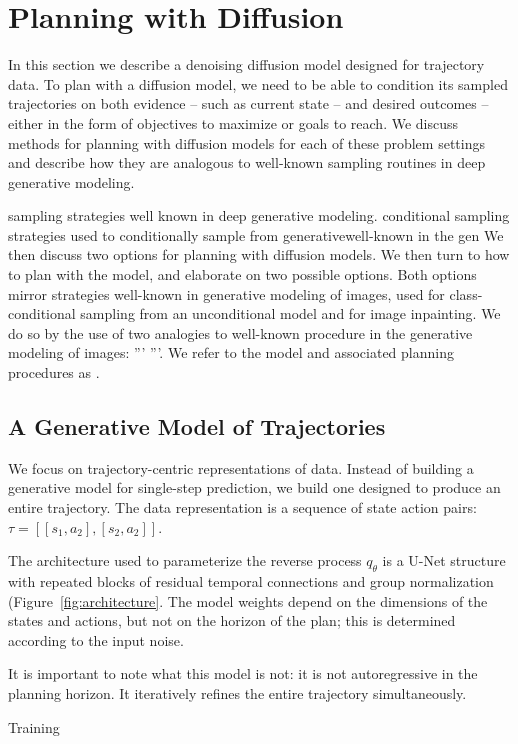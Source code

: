 \section{Planning with Diffusion}

In this section we describe a denoising diffusion model designed for trajectory data.
To plan with a diffusion model, we need to be able to condition its sampled trajectories on both evidence -- such as current state -- and desired outcomes -- either in the form of objectives to maximize or goals to reach.
We discuss methods for planning with diffusion models for each of these problem settings and describe how they are analogous to well-known sampling routines in deep generative modeling.

sampling strategies well known in deep generative modeling.
conditional sampling strategies used to conditionally sample from generativewell-known in the gen
We then discuss two options for planning with diffusion models.
We then turn to how to plan with the model, and elaborate on two possible options.
Both options mirror strategies well-known in generative modeling of images,
used for class-conditional sampling from an unconditional model and for image inpainting.
We do so by the use of two analogies to well-known procedure in the generative modeling of images: ''' '''.
We refer to the model and associated planning procedures as \method.

\subsection{A Generative Model of Trajectories}
We focus on trajectory-centric representations of data.
Instead of building a generative model for single-step prediction, we build one designed to produce an entire trajectory.
The data representation is a sequence of state action pairs: $\tau = [[s_1, a_2], [s_2, a_2]]$.

The architecture used to parameterize the reverse process $q_\theta$ is a U-Net structure with repeated blocks of residual temporal connections and group normalization (Figure~\ref{fig:architecture}.
The model weights depend on the dimensions of the states and actions, but not on the horizon of the plan; this is determined according to the input noise.

It is important to note what this model is not: it is not autoregressive in the planning horizon.
It iteratively refines the entire trajectory simultaneously.

Training


